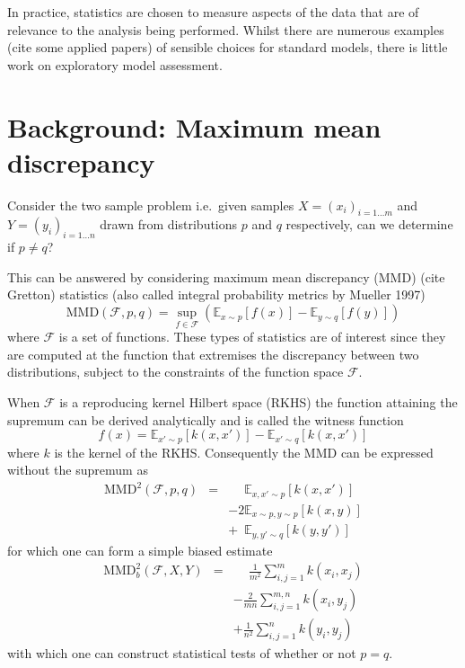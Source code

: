 \documentclass{article}
\def\ie{i.e.\ }
\begin{document}
In practice, statistics are chosen to measure aspects of the data that are of relevance to the analysis being performed.
Whilst there are numerous examples (cite some applied papers) of sensible choices for standard models, there is little work on exploratory model assessment.

\section{Background: Maximum mean discrepancy}

Consider the two sample problem \ie given samples $X = (x_i)_{i=1\ldots m}$ and $Y = (y_i)_{i=1\ldots n}$ drawn \iid from distributions $p$ and $q$ respectively, can we determine if $p \neq q$?

This can be answered by considering maximum mean discrepancy (MMD) (cite Gretton) statistics (also called integral probability metrics by Mueller 1997)
\begin{equation}
\textrm{MMD}(\mathcal{F},p,q) = \sup_{f \in \mathcal{F}}(\mathbb{E}_{x\sim p}[f(x)] - \mathbb{E}_{y\sim q}[f(y)])
\end{equation}
where $\mathcal{F}$ is a set of functions.
These types of statistics are of interest since they are computed at the function that extremises the discrepancy between two distributions, subject to the constraints of the function space $\mathcal{F}$.

When $\mathcal{F}$ is a reproducing kernel Hilbert space (RKHS) the function attaining the supremum can be derived analytically and is called the witness function
\begin{equation}
f(x) = \mathbb{E}_{x'\sim p}[k(x,x')] - \mathbb{E}_{x'\sim q}[k(x,x')]
\end{equation}
where $k$ is the kernel of the RKHS.
Consequently the MMD can be expressed without the supremum as
\begin{eqnarray}
\textrm{MMD}^2(\mathcal{F},p,q) & = & \phantom{-2}\mathbb{E}_{x,x'\sim p}[k(x,x')] \nonumber\\
&& - 2\mathbb{E}_{x\sim p,y\sim p}[k(x,y)] \nonumber\\
&& + \phantom{2}\mathbb{E}_{y,y'\sim q}[k(y,y')]
\end{eqnarray}
for which one can form a simple biased estimate
\begin{eqnarray}
\textrm{MMD}_b^2(\mathcal{F},X,Y) & = & \phantom{+}\frac{1}{m^2}\sum_{i,j=1}^{m}k(x_i,x_j) \nonumber\\
&& - \frac{2}{mn}\sum_{i,j=1}^{m,n}k(x_i,y_j) \nonumber\\
&& + \frac{1}{n^2}\sum_{i,j=1}^{n}k(y_i,y_j)
\end{eqnarray}
with which one can construct statistical tests of whether or not $p=q$.
\end{document}
